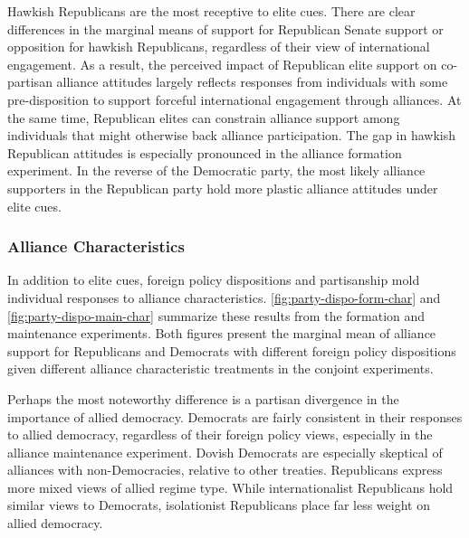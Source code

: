 \documentclass[12pt]{article}
\begin{document}
Hawkish Republicans are the most receptive to elite cues. 
There are clear differences in the marginal means of support for Republican Senate support or opposition for hawkish Republicans, regardless of their view of international engagement. 
As a result, the perceived impact of Republican elite support on co-partisan alliance attitudes largely reflects responses from individuals with some pre-disposition to support forceful international engagement through alliances. 
At the same time, Republican elites can constrain alliance support among individuals that might otherwise back alliance participation.
The gap in hawkish Republican attitudes is especially pronounced in the alliance formation experiment. 
In the reverse of the Democratic party, the most likely alliance supporters in the Republican party hold more plastic alliance attitudes under elite cues. 




\subsubsection{Alliance Characteristics}



In addition to elite cues, foreign policy dispositions and partisanship mold individual responses to alliance characteristics. 
\autoref{fig:party-dispo-form-char} and \autoref{fig:party-dispo-main-char} summarize these results from the formation and maintenance experiments. 
Both figures present the marginal mean of alliance support for Republicans and Democrats with different foreign policy dispositions given different alliance characteristic treatments in the conjoint experiments. 



Perhaps the most noteworthy difference is a partisan divergence in the importance of allied democracy. 
Democrats are fairly consistent in their responses to allied democracy, regardless of their foreign policy views, especially in the alliance maintenance experiment. 
Dovish Democrats are especially skeptical of alliances with non-Democracies, relative to other treaties. 
Republicans express more mixed views of allied regime type. 
While internationalist Republicans hold similar views to Democrats, isolationist Republicans place far less weight on allied democracy. 
\end{document}
